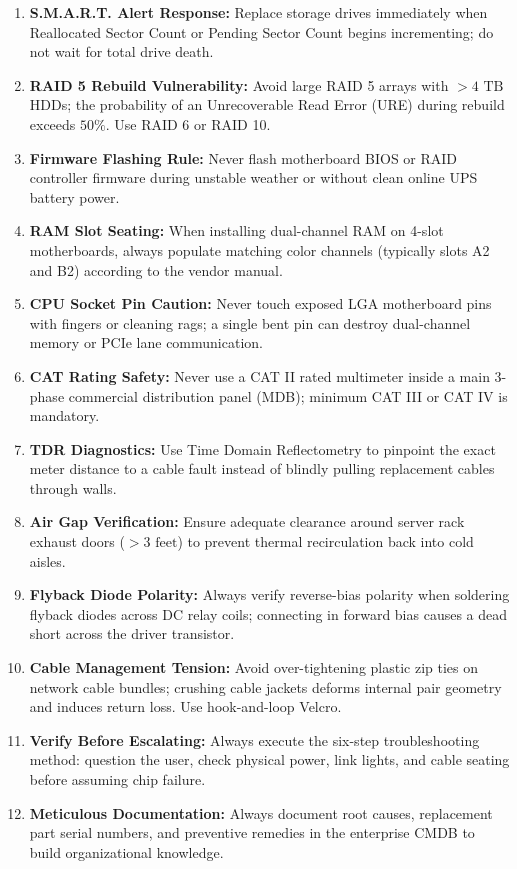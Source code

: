 \begin{enumerate}[leftmargin=*]
    \item \textbf{S.M.A.R.T. Alert Response:} Replace storage drives immediately when Reallocated Sector Count or Pending Sector Count begins incrementing; do not wait for total drive death.
    \item \textbf{RAID 5 Rebuild Vulnerability:} Avoid large RAID 5 arrays with $>4\text{ TB}$ HDDs; the probability of an Unrecoverable Read Error (URE) during rebuild exceeds $50\%$. Use RAID 6 or RAID 10.
    \item \textbf{Firmware Flashing Rule:} Never flash motherboard BIOS or RAID controller firmware during unstable weather or without clean online UPS battery power.
    \item \textbf{RAM Slot Seating:} When installing dual-channel RAM on 4-slot motherboards, always populate matching color channels (typically slots A2 and B2) according to the vendor manual.
    \item \textbf{CPU Socket Pin Caution:} Never touch exposed LGA motherboard pins with fingers or cleaning rags; a single bent pin can destroy dual-channel memory or PCIe lane communication.
    \item \textbf{CAT Rating Safety:} Never use a CAT II rated multimeter inside a main 3-phase commercial distribution panel (MDB); minimum CAT III or CAT IV is mandatory.
    \item \textbf{TDR Diagnostics:} Use Time Domain Reflectometry to pinpoint the exact meter distance to a cable fault instead of blindly pulling replacement cables through walls.
    \item \textbf{Air Gap Verification:} Ensure adequate clearance around server rack exhaust doors ($>3\text{ feet}$) to prevent thermal recirculation back into cold aisles.
    \item \textbf{Flyback Diode Polarity:} Always verify reverse-bias polarity when soldering flyback diodes across DC relay coils; connecting in forward bias causes a dead short across the driver transistor.
    \item \textbf{Cable Management Tension:} Avoid over-tightening plastic zip ties on network cable bundles; crushing cable jackets deforms internal pair geometry and induces return loss. Use hook-and-loop Velcro.
    \item \textbf{Verify Before Escalating:} Always execute the six-step troubleshooting method: question the user, check physical power, link lights, and cable seating before assuming chip failure.
    \item \textbf{Meticulous Documentation:} Always document root causes, replacement part serial numbers, and preventive remedies in the enterprise CMDB to build organizational knowledge.
\end{enumerate}
